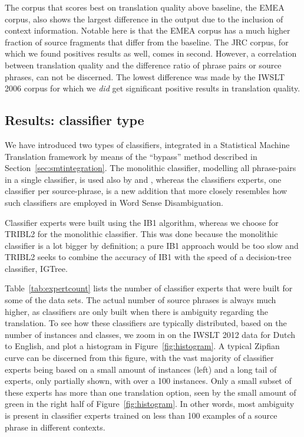 \documentclass[smallextended]{svjour3}       %
\theoremstyle{break}
\begin{document}
The corpus that scores best on translation quality above baseline, the EMEA
corpus, also shows the largest difference in the output due to the inclusion of
context information. Notable here is that the EMEA corpus has a much higher fraction
of source fragments that differ from the baseline. The JRC corpus, for which we
found positives results as well, comes in second. However, a correlation
between translation quality and the difference ratio of phrase pairs or source
phrases, can not be discerned. The lowest difference was made by the IWSLT 2006
corpus for which we \emph{did} get significant positive results in translation
quality.


\subsection{Results: classifier type}
\label{sec:typeopt}

We have introduced two types of classifiers, integrated in a Statistical
Machine Translation framework by means of the ``bypass'' method described in
Section~\ref{sec:smtintegration}. The monolithic classifier, modelling all phrase-pairs
in a single classifier, is used also by \cite{Stroppa+07} and
\cite{Rejwanul+11}, whereas the classifiers experts, one classifier per
source-phrase, is a new addition that more closely resembles how such
classifiers are employed in Word Sense Disambiguation.

Classifier experts were built using the IB1 algorithm, whereas we choose for
TRIBL2 for the monolithic classifier. This was done because the monolithic
classifier is a lot bigger by definition; a pure IB1 approach would be too slow
and TRIBL2 seeks to combine the accuracy of IB1 with the speed of a
decision-tree classifier, IGTree.

Table~\ref{tab:expertcount} lists the number of classifier experts that were
built for some of the data sets. The actual number of source phrases is always
much higher, as classifiers are only built when there is ambiguity regarding
the translation. To see how these classifiers are typically distributed, based
on the number of instances and classes, we zoom in on the IWSLT 2012 data for
Dutch to English, and plot a histogram in
Figure~\ref{fig:histogram}. A typical Zipfian curve can be discerned from
this figure, with the vast majority of classifier experts being based
on a small amount of instances (left) and a long tail of experts, only
partially shown, with over a 100 instances. Only a small subset of
these experts has more than one translation option, seen by the small
amount of green in the right half of Figure~\ref{fig:histogram}. In
other words, most ambiguity is present in classifier experts trained on less than
100 examples of a source phrase in different contexts. 
\end{document}
